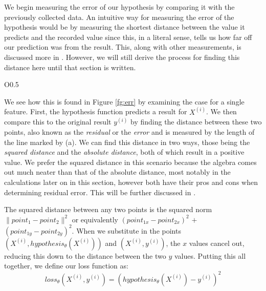 We begin measuring the error of our hypothesis by comparing it with the
previously collected data.  An intuitive way for measuring the  error of the
hypothesis would be by measuring the shortest distance between the value it
predicts and the recorded value since this, in a literal sense, tells us how far
off our prediction was from the result. This, along with other measurements,
is discussed more in \placeholder. However, we will still derive the process for
finding this distance here until that section is written.

\begin{wrapfigure}{O}{0.5\textwidth}
    \centering
    \caption{Visual representation of the distance between expected and actual
    results.}
    \label{fg:err}
\end{wrapfigure}

We see how this is found in Figure \ref{fg:err} by examining the case for a
single feature. First, the hypothesis function predicts a result for $X^{(i)}$.
We then compare this to the original result $y^{(i)}$ by finding the distance
between these two points, also known as the \emph{residual} or the \emph{error}
and is measured by the length of the line marked by (a). We can find this
distance in two ways, those being the \emph{squared distance} and the
\emph{absolute distance}, both of which result in a positive value. We prefer
the squared distance in this scenario because the algebra comes out much neater
than that of the absolute distance, most notably in the calculations later on in
this section, however both have their pros and cons when determining residual
error. This will be further discussed in \placeholder.

The squared distance between any two points is the squared norm $\| point_1 -
point_2 \|^2$ or equivalently $(point_{1x}-point_{2x})^2$ $+$
$(point_{1y}-point_{2y})^2$. When we substitute in the points $(X^{(i)},
hypothesis_{\theta}(X^{(i)}))$ and $(X^{(i)}, y^{(i)})$, the $x$ values cancel
out, reducing this down to the distance between the two $y$ values. Putting this
all together, we define our loss function as:
\begin{equation}
    loss_{\theta}(X^{(i)}, y^{(i)}) = (hypothesis_{\theta}(X^{(i)}) - y^{(i)})^2
\end{equation}

